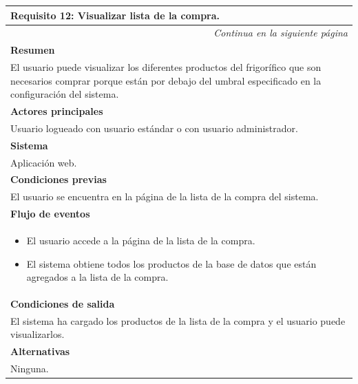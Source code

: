 \begin{longtable}{|p{}|}
\hline
 \rowcolor[gray]{.5}
 \color{white}\textbf{Requisito 12: Visualizar lista de la compra.} \\
\hline
\endfirsthead
\endhead
\hline \multicolumn{1}{r}{\textit{Continua en la siguiente página}} \\
\endfoot
\endlastfoot
    \rowcolor[gray]{.9}
    \textbf{Resumen} \\
     \hline
     El usuario puede visualizar los diferentes productos del frigorífico que son necesarios comprar porque están por debajo del umbral especificado en la configuración del sistema. \\
    \hline
    \rowcolor[gray]{.9}
    \textbf{Actores principales} \\
     \hline
     Usuario logueado con usuario estándar o con usuario administrador. \\
    \hline
    \rowcolor[gray]{.9}
    \textbf{Sistema} \\
     \hline
     Aplicación web. \\
    \hline
    \rowcolor[gray]{.9}
    \textbf{Condiciones previas} \\
     \hline
     El usuario se encuentra en la página de la lista de la compra del sistema. \\
    \hline
    \rowcolor[gray]{.9}
    \textbf{Flujo de eventos}  \\
     \hline
      \begin{itemize}
         \item El usuario accede a la página de la lista de la compra.
         \item El sistema obtiene todos los productos de la base de datos que están agregados a la lista de la compra.
    \end{itemize} \\
    \hline
    \rowcolor[gray]{.9}
    \textbf{Condiciones de salida} \\
     \hline
     El sistema ha cargado los productos de la lista de la compra y el usuario puede visualizarlos. \\
    \hline
    \rowcolor[gray]{.9}
    \textbf{Alternativas}  \\
     \hline
      Ninguna.\\
    \hline
\end{longtable}

